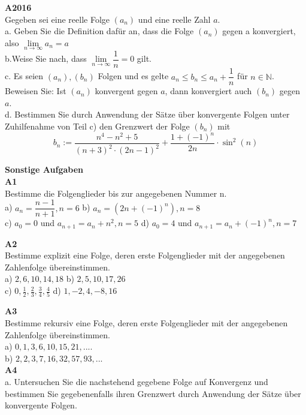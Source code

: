 \documentclass[landscape,twocolumn,a4paper]{article}
\begin{document}
\textbf{A2016} \\
Gegeben sei eine reelle Folge $(a_n)$ und eine reelle Zahl $a$. \\
a. Geben Sie die Definition dafür an, dass die Folge $(a_n)$ gegen a konvergiert, also $\lim \limits_{n \to \infty} a_n = a$ \\
b.Weise Sie nach, dass  $ \lim \limits_{n \to \infty} \dfrac{1}{n} = 0$ gilt. \\
c. Es seien $(a_n), (b_n)$ Folgen und es gelte $a_n \le b_n \le a_n + \dfrac{1}{n}$ für $n \in \mathbb{N}$.
Beweisen Sie: Ist $(a_n)$ konvergent gegen $a$, dann konvergiert auch $(b_n)$ gegen $a$. \\
d. Bestimmen Sie durch Anwendung der Sätze über konvergente Folgen unter Zuhilfenahme von Teil c) den Grenzwert der Folge $(b_n)$ mit 
$$b_n := \dfrac{n^4-n^2+5}{(n+3)^2 \cdot (2n-1)^2} + \dfrac{1+(-1)^n}{2n} \cdot  \sin^2(n)$$
\bigskip

\newpage

\textbf{Sonstige Aufgaben} \\

\textbf{A1} \\
Bestimme die Folgenglieder bis zur angegebenen Nummer n. \\
a) $a_n= \dfrac{n-1}{n+1}, n = 6$ \quad b) $a_n=(2n+(-1)^n), n=8$  \\
c) $a_0 = 0$ und $a_{n+1} = a_n + n^2, n = 5$ \quad
d) $a_0 = 4$ und $a_{n+1} = a_n +(-1)^n,  n = 7$

\textbf{A2} \\
Bestimme explizit eine Folge, deren erste Folgenglieder mit der angegebenen Zahlenfolge übereinstimmen. \\
a) $2,6,10,14,18$  \quad b) $2,5,10,17,26$  \\
c) $0,\frac{1}{2}, \frac{2}{3}, \frac{3}{4}, \frac{4}{5}$ \quad d) $1,-2,4,-8,16$ \quad


\textbf{A3} \\
Bestimme rekursiv eine Folge, deren erste Folgenglieder mit der angegebenen Zahlenfolge übereinstimmen. \\
a) $0,1,3,6,10,15,21,....$ \\
b) $2,2,3,7,16,32,57,93,...$ \\


\textbf{A4} \\
a. Untersuchen Sie die nachstehend gegebene Folge auf Konvergenz und bestimmen Sie gegebenenfalls
ihren Grenzwert durch Anwendung der Sätze über konvergente Folgen. 
\end{document}
